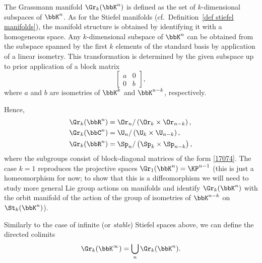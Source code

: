 \begin{defn}
    The Grassmann manifold $\Gr_k(\bbK^n)$ is defined as the set of $k$-dimensional subspaces of $\bbK^n$. As for the Stiefel manifolds (cf.\ Definition~\ref{def stiefel manifolds}), the manifold structure is obtained by identifying it with a homogeneous space. Any $k$-dimensional subspace of $\bbK^n$ can be obtained from the subspace spanned by the first $k$ elements of the standard basis by application of a linear isometry. This transformation is determined by the given subspace up to prior application of a block matrix
    \[\begin{bmatrix}
        a&0\\0&b
    \end{bmatrix},\label{17074}\]
    where $a$ and $b$ are isometries of $\bbK^k$ and $\bbK^{n-k}$, respectively. 
    
    Hence,
    \begin{align}
        \Gr_k(\bbR^n)&=\Or_n\slash \left(\Or_k\times\Or_{n-k}\right),\\
        \Gr_k(\bbC^n)&=\U_n\slash \left(\U_k\times\U_{n-k}\right),\\
        \Gr_k(\bbR^n)&=\Sp_n\slash \left(\Sp_k\times\Sp_{n-k}\right),
    \end{align}
    where the subgroups consist of block-diagonal matrices of the form \eqref{17074}. The case $k=1$ reproduces the projective spaces $\Gr_1(\bbK^n)=\KP^{n-1}$ (this is just a homeomorphism for now; to show that this is a diffeomorphism we will need to study more general Lie group actions on manifolds and identify $\Gr_k(\bbK^n)$ with the orbit manifold of the action of the group of isometries of $\bbK^{n-k}$ on $\St_k(\bbK^n)$).
\end{defn}


\begin{defn}
    Similarly to the case of infinite (or \emph{stable}) Stiefel spaces above, we can define the directed colimits
    \[\Gr_k(\bbK^\infty)=\bigcup_n \Gr_k(\bbK^n).\]
\end{defn}

